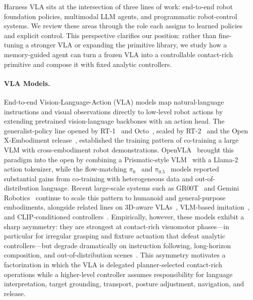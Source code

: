 \documentclass[11pt]{article}
\begin{document}
Harness VLA sits at the intersection of three lines of work: end-to-end robot foundation policies, multimodal LLM agents, and programmatic robot-control systems. We review these areas through the role each assigns to learned policies and explicit control. This perspective clarifies our position: rather than fine-tuning a stronger VLA or expanding the primitive library, we study how a memory-guided agent can turn a frozen VLA into a controllable contact-rich primitive and compose it with fixed analytic controllers.

	\paragraph{VLA Models.} End-to-end Vision-Language-Action (VLA) models map natural-language instructions and visual observations directly to low-level robot actions by extending pretrained vision-language backbones with an action head. The generalist-policy line opened by RT-1~\citep{brohan2022rt} and Octo~\citep{octo_2023}, scaled by RT-2~\citep{brohan2023rt2} and the Open X-Embodiment release~\citep{open_x_embodiment_rt_x_2023}, established the training pattern of co-training a large VLM with cross-embodiment robot demonstrations. OpenVLA~\citep{kim2024openvla} brought this paradigm into the open by combining a Prismatic-style VLM~\citep{karamcheti2024prismatic} with a Llama-2 action tokenizer, while the flow-matching $\pi_0$~\citep{black2025pi0} and $\pi_{0.5}$~\citep{black2025pi05} models reported substantial gains from co-training with heterogeneous data and out-of-distribution language. Recent large-scale systems such as GR00T~\citep{bjorck2025gr00t} and Gemini Robotics~\citep{team2025gemini} continue to scale this pattern to humanoid and general-purpose embodiments, alongside related lines on 3D-aware VLAs~\citep{zhen20243dvla, driess2023palme}, VLM-based imitation~\citep{li2024roboflamingo, huang2023embodied}, and CLIP-conditioned controllers~\citep{shridhar2022cliport, chi2023diffusion, zhao2023act}. Empirically, however, these models exhibit a sharp asymmetry: they are strongest at contact-rich visuomotor phases---in particular for irregular grasping and fixture actuation that defeat analytic controllers---but degrade dramatically on instruction following, long-horizon composition, and out-of-distribution scenes~\citep{kim2024openvla, black2025pi05, pi0-experiment-wild}. This asymmetry motivates a factorization in which the VLA is delegated planner-selected contact-rich operations while a higher-level controller assumes responsibility for language interpretation, target grounding, transport, posture adjustment, navigation, and release.
\end{document}
